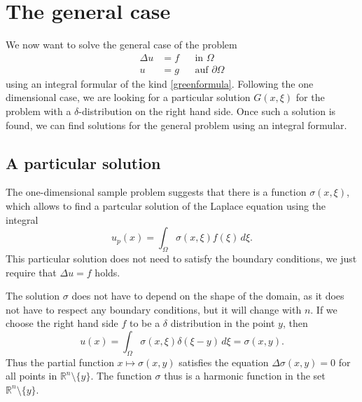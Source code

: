 %
%
%
\section{The general case}
We now want to solve the general case of the problem
\begin{align*}
\Delta u&=f&&\text{in $\Omega$}\\
u&=g&&\text{auf $\partial\Omega$}
\end{align*}
using an integral formular of the kind
\eqref{greenformula}.
Following the one dimensional case, we are looking for a particular
solution $G(x,\xi)$ for the problem with a $\delta$-distribution on
the right hand side.
Once such a solution is found, we can find solutions for the general
problem using an integral formular.

\subsection{A particular solution}
The one-dimensional sample problem suggests that there is a function
$\sigma(x,\xi)$, which allows to find a partcular solution of the
Laplace equation using the integral
\begin{equation}
u_p(x)=\int_\Omega \sigma(x,\xi)  f(\xi)\,d\xi.
\label{singulaereloesunglaplace}
\end{equation}
This particular solution does not need to satisfy the boundary conditions,
we just require that $\Delta u=f$ holds.

The solution $\sigma$ does not have to depend on the shape of the domain,
as it does not have to respect any boundary conditions,
but it will change with $n$.
If we choose the right hand side $f$ to be a $\delta$ distribution in the
point $y$, then
\[
u(x)
=
\int_\Omega \sigma(x,\xi)\delta(\xi - y)\,d\xi
=
\sigma(x,y).
\]
Thus the partial function $x\mapsto \sigma(x,y)$ satisfies the equation
$\Delta \sigma(x,y)=0$ for all points in ${\mathbb R}^n\setminus\{y\}$.
The function $\sigma$ thus is a harmonic function in the set
$\mathbb R^n\setminus\{y\}$.


